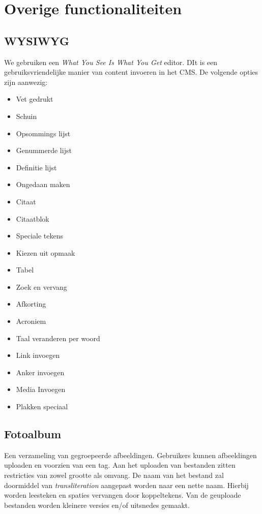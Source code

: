 
\section{Overige functionaliteiten}
\label{sec:overigefunctionaliteiten}

\subsection{WYSIWYG}
We gebruiken een \emph{What You See Is What You Get} editor. DIt is een gebruiksvriendelijke manier van content invoeren in het CMS. De volgende opties zijn aanwezig:

\begin{itemize}
  \item Vet gedrukt
  \item Schuin
  \item Opsommings lijst
  \item Genummerde lijst 
  \item Definitie lijst
  \item Ongedaan maken
   \item Citaat
  \item Citaatblok
  \item Speciale tekens
  \item Kiezen uit opmaak
  \item Tabel
  \item Zoek en vervang
  \item Afkorting
  \item Acroniem
  \item Taal veranderen per woord
  \item Link invoegen
  \item Anker invoegen
  \item Media Invoegen
  \item Plakken speciaal
\end{itemize}

\subsection{Fotoalbum}
Een verzameling van gegroepeerde afbeeldingen. Gebruikers kunnen afbeeldingen uploaden en voorzien van een tag. Aan het uploaden van bestanden zitten restricties van zowel grootte als omvang. De naam van het bestand zal doormiddel van \emph{transliteration} aangepast worden naar een nette naam. Hierbij worden leesteken en spaties vervangen door koppeltekens. Van de geuploade bestanden worden kleinere versies en/of uitsnedes gemaakt.

